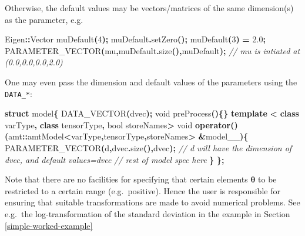 \documentclass[
]{book}
\newenvironment{Shaded}{\begin{snugshade}}{\end{snugshade}}
\newcommand{\CommentTok}[1]{\textcolor[rgb]{0.56,0.35,0.01}{\textit{#1}}}
\newcommand{\DataTypeTok}[1]{\textcolor[rgb]{0.13,0.29,0.53}{#1}}
\newcommand{\DecValTok}[1]{\textcolor[rgb]{0.00,0.00,0.81}{#1}}
\newcommand{\FloatTok}[1]{\textcolor[rgb]{0.00,0.00,0.81}{#1}}
\newcommand{\KeywordTok}[1]{\textcolor[rgb]{0.13,0.29,0.53}{\textbf{#1}}}
\newcommand{\NormalTok}[1]{#1}
\newcommand{\OperatorTok}[1]{\textcolor[rgb]{0.81,0.36,0.00}{\textbf{#1}}}
\begin{document}
Otherwise, the default values may be vectors/matrices of the same dimension(s) as the parameter, e.g.

\begin{Shaded}
\begin{Highlighting}[]
\NormalTok{Eigen}\OperatorTok{::}\NormalTok{Vector muDefault}\OperatorTok{(}\DecValTok{4}\OperatorTok{);}
\NormalTok{muDefault}\OperatorTok{.}\NormalTok{setZero}\OperatorTok{();}
\NormalTok{muDefault}\OperatorTok{(}\DecValTok{3}\OperatorTok{)} \OperatorTok{=} \FloatTok{2.0}\OperatorTok{;}
\NormalTok{PARAMETER\_VECTOR}\OperatorTok{(}\NormalTok{mu}\OperatorTok{,}\NormalTok{muDefault}\OperatorTok{.}\NormalTok{size}\OperatorTok{(),}\NormalTok{muDefault}\OperatorTok{);}
\CommentTok{// mu is intiated at (0.0,0.0,0.0,2.0)}
\end{Highlighting}
\end{Shaded}

One may even pass the dimension and default values of the parameters using the \texttt{DATA\_*}:

\begin{Shaded}
\begin{Highlighting}[]
\KeywordTok{struct}\NormalTok{ model}\OperatorTok{\{}
\NormalTok{  DATA\_VECTOR}\OperatorTok{(}\NormalTok{dvec}\OperatorTok{);}
  \DataTypeTok{void}\NormalTok{ preProcess}\OperatorTok{()\{\}}
  \KeywordTok{template} \OperatorTok{\textless{}} \KeywordTok{class}\NormalTok{ varType}\OperatorTok{,} \KeywordTok{class}\NormalTok{ tensorType}\OperatorTok{,} \DataTypeTok{bool}\NormalTok{ storeNames}\OperatorTok{\textgreater{}}
  \DataTypeTok{void} \KeywordTok{operator}\OperatorTok{()(}\NormalTok{amt}\OperatorTok{::}\NormalTok{amtModel}\OperatorTok{\textless{}}\NormalTok{varType}\OperatorTok{,}\NormalTok{tensorType}\OperatorTok{,}\NormalTok{storeNames}\OperatorTok{\textgreater{}} \OperatorTok{\&}\NormalTok{model\_\_}\OperatorTok{)\{}
\NormalTok{    PARAMETER\_VECTOR}\OperatorTok{(}\NormalTok{d}\OperatorTok{,}\NormalTok{dvec}\OperatorTok{.}\NormalTok{size}\OperatorTok{(),}\NormalTok{dvec}\OperatorTok{);}
    \CommentTok{// d will have the dimension of dvec, and default values=dvec}
    \CommentTok{// rest of model spec here}
  \OperatorTok{\}}
\OperatorTok{\};}
\end{Highlighting}
\end{Shaded}

Note that there are no facilities for specifying that certain elements \(\boldsymbol \theta\) to be restricted to a certain range (e.g.~positive). Hence the user is responsible for ensuring that suitable transformations are made to avoid numerical problems. See e.g.~the log-transformation of the standard deviation in the example in Section \ref{simple-worked-example}
\end{document}
